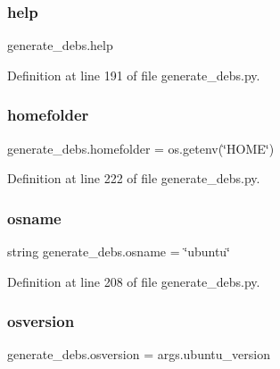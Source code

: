 \subsubsection{\texorpdfstring{help}{help}}
{\footnotesize\ttfamily generate\+\_\+debs.\+help}



Definition at line 191 of file generate\+\_\+debs.\+py.

\mbox{\label{namespacegenerate__debs_aeb83979be2939a8059435a906a91f682}} 
\subsubsection{\texorpdfstring{homefolder}{homefolder}}
{\footnotesize\ttfamily generate\+\_\+debs.\+homefolder = os.\+getenv(\char`\"{}H\+O\+ME\char`\"{})}



Definition at line 222 of file generate\+\_\+debs.\+py.

\mbox{\label{namespacegenerate__debs_ad06322332de29cb27a40152d0cccc2ca}} 
\subsubsection{\texorpdfstring{osname}{osname}}
{\footnotesize\ttfamily string generate\+\_\+debs.\+osname = \char`\"{}ubuntu\char`\"{}}



Definition at line 208 of file generate\+\_\+debs.\+py.

\mbox{\label{namespacegenerate__debs_afd02fe6ead63bc5db5d3c3b9eb973b62}} 
\subsubsection{\texorpdfstring{osversion}{osversion}}
{\footnotesize\ttfamily generate\+\_\+debs.\+osversion = args.\+ubuntu\+\_\+version}



